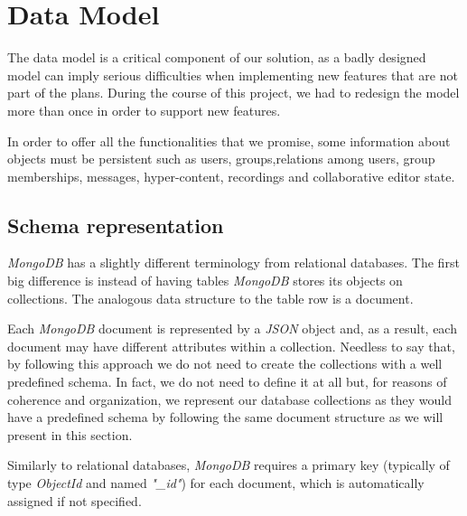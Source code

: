 
\section{Data Model}
The data model is a critical component of our solution, as a badly designed model can imply serious difficulties when implementing new features that are not part of the plans. During the course of this project, we had to redesign the model more than once in order to support new features.


In order to offer all the functionalities that we promise, some information about objects must be persistent such as users, groups,relations among users, group memberships, messages, hyper-content, recordings and collaborative editor state.

\subsection {Schema representation}
    \emph{MongoDB} has a slightly different terminology from relational databases. The first big difference is instead of having tables \emph{MongoDB} stores its objects on collections. The analogous data structure to the table row is a document.

    Each \emph{MongoDB} document is represented by a \emph{JSON} object and, as a result, each document may have different attributes within a collection. Needless to say that, by following this approach we do not need to create the collections with a well predefined schema. In fact, we do not need to define it at all but, for reasons of coherence and organization, we represent our database collections as they would have a predefined schema by following the same document structure as we will present in this section.

    Similarly to relational databases, \emph{MongoDB} requires a primary key (typically of type \emph{ObjectId} and named \emph{"\_id"}) for each document, which is automatically assigned if not specified. 

